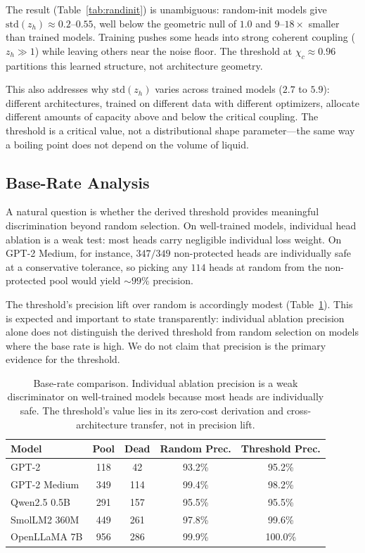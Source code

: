 \documentclass[aps,prd,onecolumn,superscriptaddress,showpacs,12pt]{revtex4-2}
\newcommand{\chic}{\chi_c}
\begin{document}
The result (Table~\ref{tab:randinit}) is unambiguous: random-init models give
$\mathrm{std}(z_h) \approx 0.2$--$0.55$, well below the geometric null of $1.0$
and $9$--$18\times$ smaller than trained models. Training pushes some heads into
strong coherent coupling ($z_h \gg 1$) while leaving others near the noise floor.
The threshold at $\chic \approx 0.96$ partitions this learned structure, not
architecture geometry.

This also addresses why $\mathrm{std}(z_h)$ varies across trained models ($2.7$
to $5.9$): different architectures, trained on different data with different
optimizers, allocate different amounts of capacity above and below the critical
coupling. The threshold is a critical value, not a distributional shape
parameter---the same way a boiling point does not depend on the volume of liquid.

\subsection{Base-Rate Analysis}

A natural question is whether the derived threshold provides meaningful
discrimination beyond random selection. On well-trained models, individual
head ablation is a weak test: most heads carry negligible individual loss
weight. On GPT-2 Medium, for instance, $347/349$ non-protected heads are
individually safe at a conservative tolerance, so picking any $114$ heads at
random from the non-protected pool would yield $\sim\!99\%$ precision.

The threshold's precision lift over random is accordingly modest
(Table~\ref{tab:baserate}). This is expected and important to state
transparently: individual ablation precision alone does not distinguish the
derived threshold from random selection on models where the base rate is
high. We do not claim that precision is the primary evidence for the
threshold.

\begin{table}[t]
\caption{\label{tab:baserate} Base-rate comparison. Individual ablation
precision is a weak discriminator on well-trained models because most heads
are individually safe. The threshold's value lies in its zero-cost
derivation and cross-architecture transfer, not in precision lift.}
\begin{tabular}{lcccc}
\toprule
Model & Pool & Dead & Random Prec. & Threshold Prec. \\
\midrule
GPT-2 & 118 & 42 & 93.2\% & 95.2\% \\
GPT-2 Medium & 349 & 114 & 99.4\% & 98.2\% \\
Qwen2.5 0.5B & 291 & 157 & 95.5\% & 95.5\% \\
SmolLM2 360M & 449 & 261 & 97.8\% & 99.6\% \\
OpenLLaMA 7B & 956 & 286 & 99.9\% & 100.0\% \\
\bottomrule
\end{tabular}
\end{table}
\end{document}
